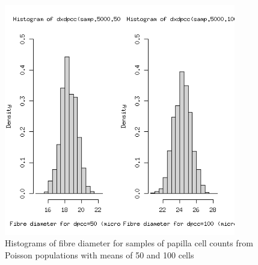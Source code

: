 %

\begin{figure}[h]
  \centering
   \includegraphics[width=0.9\textwidth]{diamhist2.png}
  \caption{Histograms of fibre diameter for samples of papilla cell counts from Poisson populations with means of 50 and 100 cells}
  \label{fig:diamhist}
\end{figure}

%

